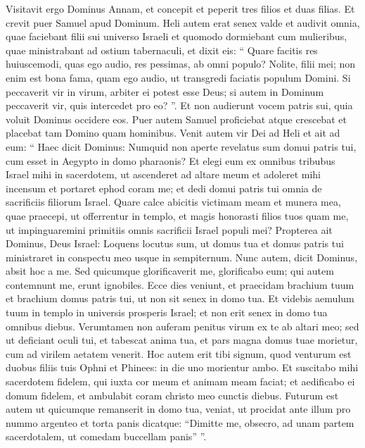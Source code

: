 \begin{biblechapter}
\begin{biblechapter}
\verse Visitavit ergo Dominus Annam, et concepit et peperit tres filios et duas filias. Et crevit puer Samuel apud Dominum.
 \verse Heli autem erat senex valde et audivit omnia, quae faciebant filii sui universo Israeli et quomodo dormiebant cum mulieribus, quae ministrabant ad ostium tabernaculi, 
\verse et dixit eis: “ Quare facitis res huiuscemodi, quas ego audio, res pessimas, ab omni populo? 
\verse Nolite, filii mei; non enim est bona fama, quam ego audio, ut transgredi faciatis populum Domini.
 \verse Si peccaverit vir in virum,
 arbiter ei potest esse Deus;
 si autem in Dominum peccaverit vir,
 quis intercedet pro eo? ”.
 Et non audierunt vocem patris sui, quia voluit Dominus occidere eos.
 \verse Puer autem Samuel proficiebat atque crescebat et placebat tam Domino quam hominibus.
 \verse Venit autem vir Dei ad Heli et ait ad eum: “ Haec dicit Dominus: Numquid non aperte revelatus sum domui patris tui, cum esset in Aegypto in domo pharaonis? 
 \verse Et elegi eum ex omnibus tribubus Israel mihi in sacerdotem, ut ascenderet ad altare meum et adoleret mihi incensum et portaret ephod coram me; et dedi domui patris tui omnia de sacrificiis filiorum Israel. 
\verse Quare calce abicitis victimam meam et munera mea, quae praecepi, ut offerrentur in templo, et magis honorasti filios tuos quam me, ut impinguaremini primitiis omnis sacrificii Israel populi mei?
 \verse Propterea ait Dominus, Deus Israel: Loquens locutus sum, ut domus tua et domus patris tui ministraret in conspectu meo usque in sempiternum. Nunc autem, dicit Dominus, absit hoc a me. Sed quicumque glorificaverit me, glorificabo eum; qui autem contemnunt me, erunt ignobiles. 
\verse Ecce dies veniunt, et praecidam brachium tuum et brachium domus patris tui, ut non sit senex in domo tua. 
\verse Et videbis aemulum tuum in templo in universis prosperis Israel; et non erit senex in domo tua omnibus diebus. 
\verse Verumtamen non auferam penitus virum ex te ab altari meo; sed ut deficiant oculi tui, et tabescat anima tua, et pars magna domus tuae morietur, cum ad virilem aetatem venerit. 
\verse Hoc autem erit tibi signum, quod venturum est duobus filiis tuis Ophni et Phinees: in die uno morientur ambo.
 \verse Et suscitabo mihi sacerdotem fidelem, qui iuxta cor meum et animam meam faciat; et aedificabo ei domum fidelem, et ambulabit coram christo meo cunctis diebus. 
\verse Futurum est autem ut quicumque remanserit in domo tua, veniat, ut procidat ante illum pro nummo argenteo et torta panis dicatque: “Dimitte me, obsecro, ad unam partem sacerdotalem, ut comedam buccellam panis” ”.
 

\end{biblechapter}
\end{biblechapter}
